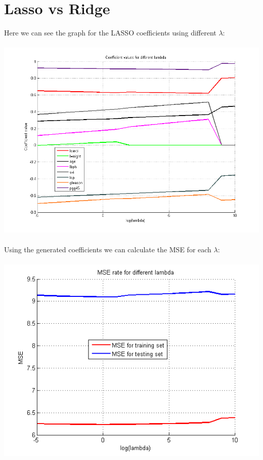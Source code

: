 \documentclass[paper=a4, fontsize=11pt]{scrartcl} %
\numberwithin{equation}{section} %
\numberwithin{figure}{section} %
\numberwithin{table}{section} %
\begin{document}
	\section{Lasso vs Ridge}
	Here we can see the graph for the LASSO coefficients using different $\lambda$:
	\\\\
	\hspace*{-3cm}\includegraphics[scale=0.8]{coeff_vs_lambda}
	\\\\
	Using the generated coefficients we can calculate the MSE for each $\lambda$:
	\\\\
	\includegraphics[]{MSE_vs_lambda}
	\\\\
\end{document}
